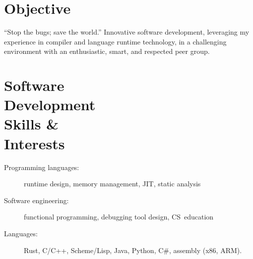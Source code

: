 \documentclass[margin,line,draft]{res}
\def\noneed#1{}
\newcommand{\mysidestyle}{\sc}
\begin{document}
%
\address{42 Pinecliff Dr, Marblehead, MA, 01945 USA\\phone: +1 857.472.3757\\
e-mail: {\tt felix.klock@gmail.com}
}
\begin{resume}
  \vspace{-7mm}

    \section{\mysidestyle Objective}
    ``Stop the bugs; save the world.'' Innovative software development,
    leveraging my experience
    in compiler and language runtime technology,
    in a challenging environment with
    an enthusiastic, smart, and respected peer group.

    \vspace{-4mm}
    \section{\mysidestyle Software\\Development\\Skills \&\\Interests}
    \begin{description}
      \item[\rm Programming languages:] runtime design, memory management, JIT, static analysis
        \vspace{-1ex}
      \item[\rm Software engineering:] functional programming, \noneed{system modeling, }debugging tool design, CS~education%
        \noneed{\\ Programming Language Design: Type and Effect Systems, Syntatic Extension}
        \vspace{-1ex}
      \item[\rm Languages:] Rust, C/C++, Scheme/Lisp, Java, Python, C\#, assembly (x86, ARM)\noneed{, FORTH, \LaTeXe}.
    \end{description}

\end{resume}
\end{document}
